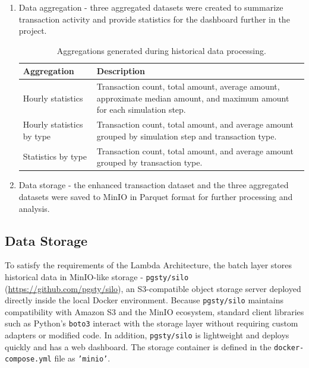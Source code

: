 \documentclass[titlepage]{article}
\begin{document}
\begin{enumerate}
    \item Data aggregation - three aggregated datasets were created to summarize transaction activity and provide statistics for the dashboard further in the project.
    \begin{table}[H]
        \centering
        \caption{Aggregations generated during historical data processing.}
        \label{tab:historical_aggregations}
        \small
        \begin{tabular}{lp{9cm}}
            \toprule
            \textbf{Aggregation} & \textbf{Description}\\
            \midrule
            Hourly statistics & Transaction count, total amount, average amount, approximate median amount, and maximum amount for each simulation step.\\
            Hourly statistics by type & Transaction count, total amount, and average amount grouped by simulation step and transaction type.\\
            Statistics by type & Transaction count, total amount, and average amount grouped by transaction type.\\
            \bottomrule
        \end{tabular}
    \end{table}

    \item Data storage - the enhanced transaction dataset and the three aggregated datasets were saved to MinIO in Parquet format for further processing and analysis.

\end{enumerate}

\subsection{Data Storage}

To satisfy the requirements of the Lambda Architecture, the batch layer stores historical data in MinIO-like storage - \texttt{pgsty/silo} (\url{https://github.com/pgsty/silo}), an S3-compatible object storage server deployed directly inside the local Docker environment.
Because \texttt{pgsty/silo} maintains compatibility with Amazon S3 and the MinIO ecosystem, standard client libraries such as Python's \texttt{boto3} interact with the storage layer without requiring custom adapters or modified code.
In addition, \texttt{pgsty/silo} is lightweight and deploys quickly and has a web dashboard.
The storage container is defined in the \texttt{docker-compose.yml} file as \texttt{'minio'}. 
\end{document}
